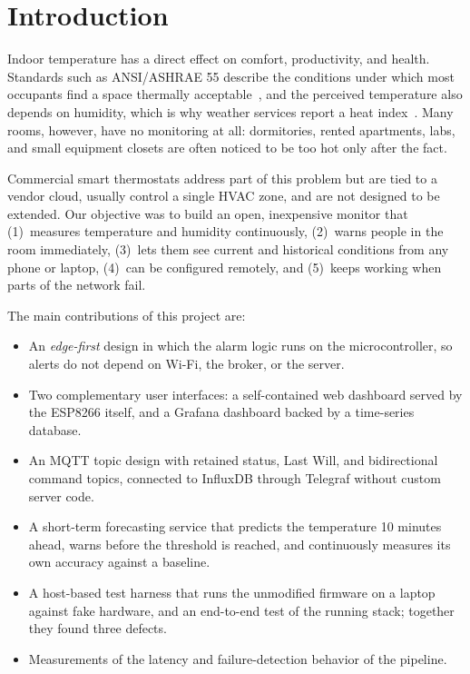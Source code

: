 \documentclass[conference]{IEEEtran}
\begin{document}
\section{Introduction}

Indoor temperature has a direct effect on comfort, productivity, and health. Standards
such as ANSI/ASHRAE 55 describe the conditions under which most occupants find a space
thermally acceptable~\cite{ashrae55}, and the perceived temperature also depends on
humidity, which is why weather services report a heat index~\cite{rothfusz,steadman}.
Many rooms, however, have no monitoring at all: dormitories, rented apartments, labs,
and small equipment closets are often noticed to be too hot only after the fact.

Commercial smart thermostats address part of this problem but are tied to a vendor
cloud, usually control a single HVAC zone, and are not designed to be extended. Our
objective was to build an open, inexpensive monitor that (1)~measures temperature and
humidity continuously, (2)~warns people in the room immediately, (3)~lets them see
current and historical conditions from any phone or laptop, (4)~can be configured
remotely, and (5)~keeps working when parts of the network fail.

The main contributions of this project are:
\begin{itemize}
  \item An \emph{edge-first} design in which the alarm logic runs on the
        microcontroller, so alerts do not depend on Wi-Fi, the broker, or the server.
  \item Two complementary user interfaces: a self-contained web dashboard served by
        the ESP8266 itself, and a Grafana dashboard backed by a time-series database.
  \item An MQTT topic design with retained status, Last Will, and bidirectional
        command topics, connected to InfluxDB through Telegraf without custom server code.
  \item A short-term forecasting service that predicts the temperature 10 minutes
        ahead, warns before the threshold is reached, and continuously measures its own
        accuracy against a baseline.
  \item A host-based test harness that runs the unmodified firmware on a laptop against
        fake hardware, and an end-to-end test of the running stack; together they
        found three defects.
  \item Measurements of the latency and failure-detection behavior of the pipeline.
\end{itemize}
\end{document}
